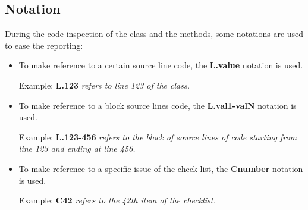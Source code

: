 \subsection{Notation}

During the code inspection of the class and the methods, some notations are used to ease the reporting:

\begin{itemize}
	\item To make reference to a certain source line code, the \textbf{L.value} notation is used.

Example: \textbf{L.123} \textit{refers to line 123 of the class.}
	\item To make reference to a block source lines code, the \textbf{L.val1-valN} notation is used.

Example: \textbf{L.123-456} \textit{refers to the block of source lines of code starting from line 123 and ending at line 456.}
	\item To make reference to a specific issue of the check list, the \textbf{Cnumber} notation is used.

Example: \textbf{C42} \textit{refers to the 42th item of the checklist.}
\end{itemize}
